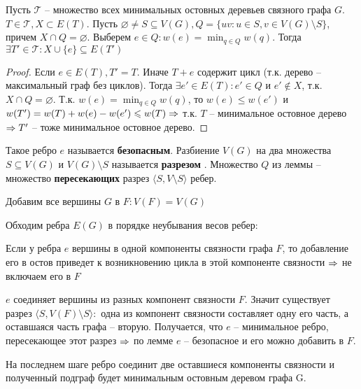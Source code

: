 	\begin{Lm}
		Пусть $\mathscr{T}$  -- множество всех минимальных остовных деревьев связного графа $G$. $T \in \mathscr{T}, X \subset E(T)$. 
		Пусть $\varnothing \neq S \subseteq V(G), Q = \{uv : u \in S, v \in V(G) \setminus S\}$, причем $X \cap Q = \varnothing$.
		Выберем $e \in Q : w(e) = \min_{q \in Q} w(q)$. Тогда $\exists T' \in \mathscr{T} : X \cup \{e\} \subseteq E(T')$   
	\end{Lm}

	\begin{proof}
		Если $e \in E(T), T' = T$. Иначе $T + e$ содержит цикл (т.к. дерево -- максимальный граф без циклов).
		Тогда $\exists e' \in E(T) : e' \in Q$ и $e' \notin X$, т.к. $X \cap Q = \varnothing$.
		Т.к. $w(e) = \min_{q \in Q} w(q)$, то $w(e) \leqslant w(e')$ и $w(T') = w(T) + w(e) - w(e') \leqslant w(T) \Rightarrow$ т.к. $T$ -- минимальное остовное дерево
		$\Rightarrow T'$ -- тоже минимальное остовное дерево.  
	\end{proof}

	\begin{Rem}
		Такое ребро $e$ называется \textbf{безопасным}. Разбиение $V(G)$ на два множества $S \subseteq V(G)$ и $V(G) \setminus S$ называется \textbf{разрезом} .
		Множество $Q$ из леммы -- множество \textbf{пересекающих} разрез $\langle S, V \setminus S\rangle$ ребер.  
	\end{Rem}

	\begin{Algo}
		\begin{MyList}
			\item Добавим все вершины $G$ в $F : V(F) = V(G)$ 
			\item Обходим ребра $E(G)$ в порядке неубывания весов ребер:
			\begin{MyItemize}
				\item Если у ребра $e$ вершины в одной компоненты связности графа $F$, то добавление его в остов приведет к возникновению цикла в этой компоненте связности $\Rightarrow$ не включаем его в $F$ 
				\item $e$ соединяет вершины из разных компонент связности $F$. Значит существует разрез $\langle S, V(F) \setminus S\rangle :$ одна из компонент связности
				составляет одну его часть, а оставшаяся часть графа -- вторую. Получается, что $e$ -- минимальное ребро, пересекающее этот разрез $\Rightarrow$ по лемме $e$ -- безопасное и его можно добавить в $F$.

				\item На последнем шаге ребро соединит две оставшиеся компоненты связности и полученный подграф будет минимальным остовным деревом графа G.
			\end{MyItemize}
		\end{MyList}
	\end{Algo}


